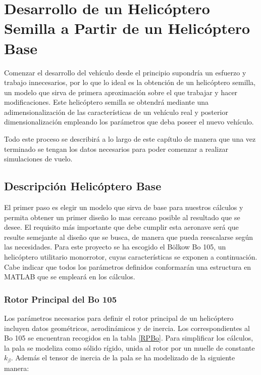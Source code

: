 \thispagestyle{empty}

\chapter{Desarrollo de un Helicóptero Semilla a Partir de un Helicóptero Base}


Comenzar el desarrollo del vehículo desde el principio supondría un esfuerzo y trabajo innecesarios, por lo que lo ideal es la obtención de un helicóptero semilla, un modelo que sirva de primera aproximación sobre el que trabajar y hacer modificaciones. Este helicóptero semilla se obtendrá mediante una adimensionalización de las características de un vehículo real y posterior dimensionalización empleando los parámetros que deba poseer el nuevo vehículo.

Todo este proceso se describirá a lo largo de este capítulo de manera que una vez terminado se tengan los datos necesarios para poder comenzar a realizar simulaciones de vuelo.

\section{Descripción Helicóptero Base}

El primer paso es elegir un modelo que sirva de base para nuestros cálculos y permita obtener un primer diseño lo mas cercano posible al resultado que se desee. El requisito más importante que debe cumplir esta aeronave será que resulte semejante al diseño que se busca, de manera que pueda reescalarse según las necesidades. Para este proyecto se ha escogido el Bölkow Bo 105, un helicóptero utilitario monorrotor, cuyas características se exponen a continuación. Cabe indicar que todos los parámetros definidos conformarán una estructura en MATLAB que se empleará en los cálculos.

\subsection{Rotor Principal del Bo 105}

Los parámetros necesarios para definir el rotor principal de un helicóptero incluyen datos geométricos, aerodinámicos y de inercia. Los correspondientes al Bo 105 se encuentran recogidos en la tabla \ref{RPBo}.
Para simplificar los cálculos, la pala se modeliza como sólido rígido, unida al rotor por un muelle de constante $k_\beta$.
Además el tensor de inercia de la pala se ha modelizado de la siguiente manera:

